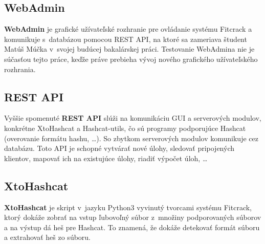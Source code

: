 \subsection{WebAdmin}
\label{webadmin}
\textbf{WebAdmin} je grafické užívateľské rozhranie pre ovládanie systému Fitcrack a komunikuje s~databázou pomocou REST API, na ktoré sa zameriava študent Matúš Múčka v~svojej budúcej bakalárskej práci.
Testovanie WebAdmina nie je súčasťou tejto práce, keďže práve prebieha vývoj nového grafického užívateľského rozhrania.

\subsection{REST API}
\label{API}
Vyššie spomenuté \textbf{REST API} slúži na komunikáciu GUI a serverových modulov, konkrétne XtoHashcat a Hashcat-utils, čo sú programy podporujúce Hashcat (overovanie formátu hashu, …).
So zbytkom serverových modulov komunikuje cez databázu.
Toto API je schopné vytvárať nové úlohy, sledovať pripojených klientov, mapovať ich na existujúce úlohy, riadiť výpočet úloh, …

\subsection{XtoHashcat}
\label{xtohashcat}
\textbf{XtoHashcat} je skript v~jazyku Python3 vyvinutý tvorcami systému Fitcrack, ktorý dokáže zobrať na vstup ľubovoľný súbor z~množiny podporovaných súborov a na výstup dá heš pre Hashcat.
To znamená, že dokáže detekovať formát súboru a extrahovať heš zo súboru.

